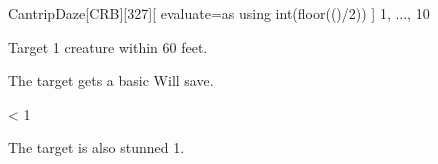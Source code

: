 
\begin{card-collection}{Cantrip}{\level}{Daze}[CRB][327]{[
  evaluate=\level as \dice using int(floor(()/2))
] \level}{1, ..., 10}




Target 1 creature within 60 feet.

The target gets a basic Will save.

\ifnum \dice < 1
\else
{}
\fi

 The target is also stunned 1.
\end{card-collection}%
